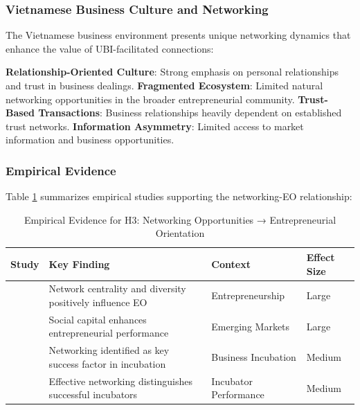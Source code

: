 \documentclass[../Main.tex]{subfiles}
\begin{document}
    \subsubsection{Vietnamese Business Culture and Networking}
    The Vietnamese business environment presents unique networking dynamics that enhance the value of UBI-facilitated connections:

    \textbf{Relationship-Oriented Culture}: Strong emphasis on personal relationships and trust in business dealings. 
    \textbf{Fragmented Ecosystem}: Limited natural networking opportunities in the broader entrepreneurial community. 
    \textbf{Trust-Based Transactions}: Business relationships heavily dependent on established trust networks. 
    \textbf{Information Asymmetry}: Limited access to market information and business opportunities.

    \subsubsection{Empirical Evidence}
    Table \ref{tab:h3_evidence} summarizes empirical studies supporting the networking-EO relationship:

    \begin{table}[H]
        \centering
        \caption{Empirical Evidence for H3: Networking Opportunities → Entrepreneurial Orientation}
        \label{tab:h3_evidence}
        \begin{tabular}{|p{3cm}|p{4cm}|p{3cm}|p{2cm}|}
            \hline
            \textbf{Study} & \textbf{Key Finding} & \textbf{Context} & \textbf{Effect Size} \\
            \hline
            \cite{stam2008entrepreneurial} & Network centrality and diversity positively influence EO & Entrepreneurship & Large \\
            \hline
            \cite{batjargal2003social} & Social capital enhances entrepreneurial performance & Emerging Markets & Large \\
            \hline
            \cite{theodorakopoulos2014business} & Networking identified as key success factor in incubation & Business Incubation & Medium \\
            \hline
            \cite{harper2018makes} & Effective networking distinguishes successful incubators & Incubator Performance & Medium \\
            \hline
        \end{tabular}
    \end{table}
\end{document}
